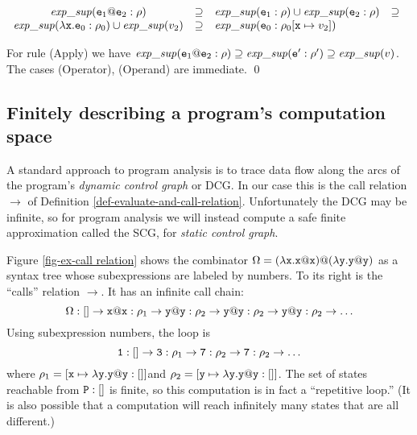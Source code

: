 \documentclass{LMCS}
\newcommand{\fl}{\noindent}
\newcommand{\hair}{\hspace{2mm}}
\newcommand{\ba}{\begin{array}}
\newcommand{\ea}{\end{array}}
\newcommand{\eprf}{\qed}
\theoremstyle{definition}\newtheorem{env}[thm]{Environment}
\begin{document}
$\ba{cclll}
{\it exp\_sup}({\tt e}_1{\tt @e}_2:\rho) & \supseteq &
  {\it exp\_sup}({\tt e}_1:\rho)\cup{\it exp\_sup}({\tt e}_2:\rho)
   & \supseteq\\

  {\it exp\_sup}(\lambda{\tt x.e}_0:\rho_0) \cup{\it 
  exp\_sup}(v_2) & \supseteq &

  {\it exp\_sup}({\tt e}_0:\rho_0[{\tt x}\mapsto v_2]) \\
  \ea
$
\medskip

\fl For rule (Apply) we have 
${\it exp\_sup}({\tt e}_1{\tt @e}_2:\rho)\supseteq
  {\it exp\_sup}({\tt e}':\rho') \supseteq
  {\it exp\_sup}(v)$.  The cases (Operator), (Operand) are immediate.
  \eprf





\subsection{Finitely describing a program's  computation space }
\label{sec-lambda-lacks}

A standard approach to program analysis is to trace data flow along the arcs of 
 the program's  {\em dynamic control graph} or DCG. In our case this is  the call relation $\to$ of
Definition \ref{def-evaluate-and-call-relation}.
Unfortunately the DCG may be infinite, so for program analysis we will 
instead compute a 
safe finite approximation called the SCG, for  {\em static control graph}. 



\begin{exa}


Figure \ref{fig-ex-call relation} shows the combinator  
$\Omega=(\lambda{\tt x.x@x}){\tt@}(\lambda{\tt y.y@y})$ as a 
syntax tree whose  subexpressions are labeled by numbers. To its right is the ``calls'' 
relation $\to$. It has an infinite call chain:
$$
\Omega:[]\to{\tt x@x}:\rho_1\to
  {\tt y@y}:\rho_2\to{\tt y@y}:\rho_2\to{\tt y@y}:\rho_2\to\ldots
$$
Using subexpression numbers, the loop is
$$
{\tt 1}:[]\to{\tt 3}:\rho_1\to{\tt 7}:\rho_2\to{\tt 7}:\rho_2\to\ldots
$$
where $\rho_1=[{\tt x}\mapsto\lambda{\tt y.y@y}:[]]$\hair and \hair
	      $\rho_2=[{\tt y}\mapsto\lambda{\tt y.y@y}:[]]$.	      
The  set of states reachable from ${\tt P}:[]$ is 
finite, so this computation is in fact a ``repetitive loop.'' 
(It is also possible that
a computation will reach infinitely many  states that are all 
different.)
\end{exa}
\bigskip
\end{document}
